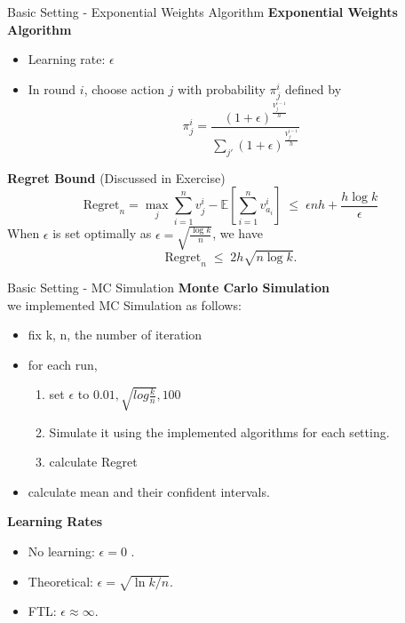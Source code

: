 \documentclass{beamer}
\begin{document}
\begin{frame}{Basic Setting - Exponential Weights Algorithm}
    \textbf{Exponential Weights Algorithm}\\[3pt]
    \begin{itemize}
        \item Learning rate: $\epsilon$
        \item In round $i$, choose action $j$ with probability $\pi_j^i$ defined by
        {\scriptsize
        \[
            \pi_j^i = 
            \frac{(1+\epsilon)^{\frac{V_j^{i-1}}{h}}}
            {\sum_{j'} (1+\epsilon)^{\frac{V_{j'}^{i-1}}{h}}}
        \]
        }
    \end{itemize}

    \vspace{2pt}
    \textbf{Regret Bound} (Discussed in Exercise)\\[3pt]
    \[
    \mathrm{Regret}_n 
    = 
    \max_j \sum_{i=1}^{n} v_j^i 
    - 
    \mathbb{E}\!\left[\sum_{i=1}^{n} v_{a_i}^i\right]
    \;\le\;
    \epsilon n h + \frac{h \log k}{\epsilon}
    \]
    When $\epsilon$ is set optimally as 
    $\epsilon = \sqrt{\frac{\log k}{n}}$, we have
    \[
    \mathrm{Regret}_n \;\le\; 2h\sqrt{n \log k}.
    \]
\end{frame}


\begin{frame}{Basic Setting - MC Simulation}
    \textbf{Monte Carlo Simulation}\\
    we implemented MC Simulation as follows:
    \begin{itemize}
        \item fix k, n, the number of iteration
        \item for each run, 
        \begin{enumerate}
            \item set $\epsilon$ to {$0.01, \sqrt{log\frac{k}{n}}, 100$}
            \item Simulate it using the implemented algorithms for each setting.
            \item calculate Regret
        \end{enumerate}
        \item calculate mean and their confident intervals.
    \end{itemize}
    \textbf{Learning Rates}\\
    \begin{itemize}
      \item No learning: \(\epsilon = 0\) .
      \item Theoretical: \(\epsilon = \sqrt{\ln k / n}\).
      \item FTL:  \(\epsilon \approx \infty\).
    \end{itemize}
\end{frame}
\end{document}
